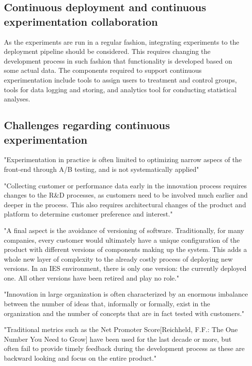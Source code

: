 \documentclass[english]{tktltiki2}
\theoremstyle{definition}
\theoremstyle{remark}
\begin{document}
\subsection{Continuous deployment and continuous experimentation collaboration}
As the experiments are run in a regular fashion, integrating experiments to the deployment pipeline should be considered. This requires changing the development process in such fashion that functionality is developed based on some actual data. The components required to support continuous experimentation include tools to assign users to treatment and control groups, tools for data logging and storing, and analytics tool for conducting statistical analyses.

\subsection{Challenges regarding continuous experimentation}
"Experimentation in practice is often limited to optimizing narrow aspecs of the front-end through A/B testing, and is not systematically applied" \cite{bosch2012building} 

"Collecting customer or performance data early in the innovation process requires changes to the R&D processes, as customers need to be involved much earlier and deeper in the process. This also requires architectural changes of the product and platform to determine customer preference and interest." \cite{bosch2012building}

"A final aspect is the avoidance of versioning of software. Traditionally, for many companies, every customer would ultimately have a unique configuration of the product with different versions of components making up the system. This adds a whole new layer of complexity to the already costly process of deploying new versions. In an IES environment, there is only one version: the currently deployed one. All other versions have been retired and play no role." \cite{bosch2012building}

"Innovation in large organization is often characterized by an enormous imbalance between the number of ideas that, informally or formally, exist in the organization and the number of concepts that are in fact tested with customers." \cite{bosch2012building}

"Traditional metrics such as the Net Promoter Score[Reichheld, F.F.: The One Number You Need to Grow] have been used for the last decade or more, but often fail to provide timely feedback during the development process as these are backward looking and focus on the entire product." \cite{bosch2012building}
\end{document}
